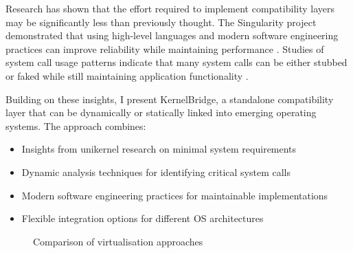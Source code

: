 \documentclass[conference]{IEEEtran}
\begin{document}
Research has shown that the effort required to implement compatibility layers may be significantly less than previously thought. The Singularity project demonstrated that using high-level languages and modern software engineering practices can improve reliability while maintaining performance \cite{singularity}. Studies of system call usage patterns indicate that many system calls can be either stubbed or faked while still maintaining application functionality \cite{lefeuvre2024loupe}.

Building on these insights, I present KernelBridge, a standalone compatibility layer that can be
dynamically or statically linked into emerging operating systems. The approach combines:
\begin{itemize}
	\item Insights from unikernel research on minimal system requirements
	\item Dynamic analysis techniques for identifying critical system calls
	\item Modern software engineering practices for maintainable implementations
	\item Flexible integration options for different OS architectures
\end{itemize}

\begin{figure}[t]
	\centering
	\caption{Comparison of virtualisation approaches}
	\label{fig:kernels}
\end{figure}
\end{document}
